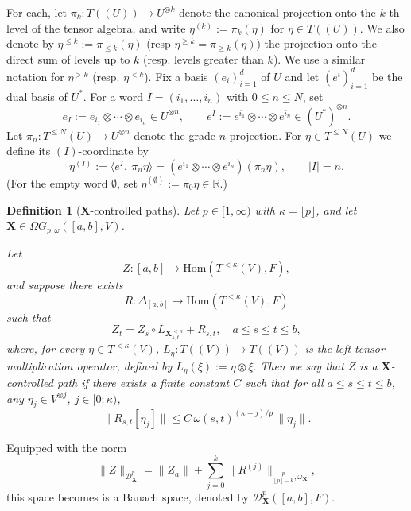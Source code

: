\documentclass{article}%
\newtheorem{definition}[theorem]{Definition}
\newcommand{\floor}[1]{\left \lfloor {#1}\right \rfloor}
\begin{document}
For each, let \(\pi_k : T((U)) \to U^{\otimes k}\) denote the canonical projection onto the \(k\)-th level of the tensor algebra, and write \(\eta^{(k)} := \pi_k(\eta)\) for \(\eta \in T((U))\).  
We also denote by \(\eta^{\le k} :=\pi_{\le k} (\eta)\) (resp $\eta^{\ge k} = \pi_{\ge k}(\eta)$) the projection onto the direct sum of levels up to \(k\) (resp. levels greater than $k$). We use a similar notation for $\eta^{>k}$ (resp. $\eta^{<k}$).\newline 
Fix a basis $(e_i)_{i=1}^d$ of $U$ and let $(e^i)_{i=1}^d$ be the dual basis of $U^*$.
For a word $I=(i_1,\dots,i_n)$ with $0\le n\le N$, set
\[
e_I := e_{i_1}\otimes\cdots\otimes e_{i_n}\in U^{\otimes n},
\qquad
e^I := e^{i_1}\otimes\cdots\otimes e^{i_n}\in (U^*)^{\otimes n}.
\]
Let $\pi_n:T^{\le N}(U)\to U^{\otimes n}$ denote the grade-$n$ projection.
For $\eta\in T^{\le N}(U)$ we define its $(I)$-coordinate by
\[
\eta^{(I)} := \langle e^I,\ \pi_n \eta\rangle
= (e^{i_1}\otimes\cdots\otimes e^{i_n})(\pi_n\eta),
\qquad |I|=n.
\]
(For the empty word $\emptyset$, set $\eta^{(\emptyset)}:=\pi_0\eta\in\mathbb{R}$.)

\begin{definition}[$\mathbf{X}$-controlled paths]
Let $p \in [1,\infty)$ with $\kappa = \lfloor p \rfloor$, and let $\mathbf{X} \in \Omega G_{p, \omega}([a,b], V)$.  

Let
\[
Z : [a,b] \to \mathrm{Hom}(T^{<\kappa}(V), F),
\]
and suppose there exists 
\[
R : \Delta_{[a,b]} \to \mathrm{Hom}(T^{<\kappa}(V), F)
\]
such that
\begin{equation}\label{1D_controlled}
Z_{t} = Z_{s} \circ L_{\mathbf{X}_{s,t}^{<\kappa}} + R_{s,t}, \quad a \le s \le t \le b,
\end{equation}
where, for every $\eta \in T^{< \kappa}(V)$, 
\(
L_\eta : T((V)) \to T((V))
\) is 
the left tensor multiplication operator, defined by
\(
L_\eta(\xi) := \eta \otimes \xi.
\) 
Then we say that $Z$ is a  $\mathbf{X}$-controlled path if there exists a finite constant $C$ such that for all $a \le s \le t \le b$, any $\eta_j \in V^{\otimes j}$, $j \in [0:\kappa)$,
\begin{equation} \label{regularuty_constraint_remainder_1d}
\| R_{s,t}[\eta_j] \| \le C \, \omega(s,t)^{(\kappa - j)/p} \, \| \eta_j \|.
\end{equation}
\end{definition}
Equipped with the norm 
\[
\|Z\|_{\mathcal{D}^p_{\mathbf{X}}} = \|Z_a\| + \sum_{j=0}^k\|R^{(j)}\|_{\frac{p}{\floor{p}-k}, \omega_{\mathbf{X}}},
\]
this space becomes is a Banach space, denoted by $\mathcal{D}^p_{\mathbf{X}}([a,b], F)$.\newline
\end{document}
